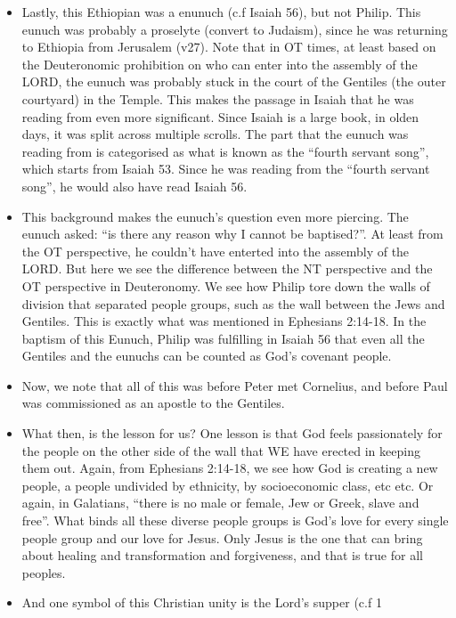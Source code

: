 \begin{itemize}
{  had his own chariot and he had hs own scroll of Isaiah.}
  \item{Lastly, this Ethiopian was a enunuch (c.f Isaiah 56), but not Philip.
  This eunuch was probably a proselyte (convert to Judaism), since he was
  returning to Ethiopia from Jerusalem (v27). Note that in OT times, at least
  based on the Deuteronomic prohibition on who can enter into the assembly of
  the LORD, the eunuch was probably stuck in the court of the Gentiles (the
  outer courtyard) in the Temple. This makes the passage in Isaiah that he
  was reading from even more significant. Since Isaiah is a large book, in
  olden days, it was split across multiple scrolls. The part that the eunuch
  was reading from is categorised as what is known as the ``fourth servant
  song'', which starts from Isaiah 53. Since he was reading from the ``fourth
  servant song'', he would also have read Isaiah 56. }
  \item{This background makes the eunuch's question even more piercing. The
  eunuch asked: ``is there any reason why I cannot be baptised?''. At least
  from the OT perspective, he couldn't have enterted into the assembly of the
  LORD. But here we see the difference between the NT perspective and the OT
  perspective in Deuteronomy. We see how Philip tore down the walls of
  division that separated people groups, such as the wall between the Jews
  and Gentiles. This is exactly what was mentioned in Ephesians 2:14-18. In
  the baptism of this Eunuch, Philip was fulfilling in Isaiah 56 that even
  all the Gentiles and the eunuchs can be counted as God's covenant people.}
  \item{Now, we note that all of this was before Peter met Cornelius, and
  before Paul was commissioned as an apostle to the Gentiles.}
  \item{What then, is the lesson for us? One lesson is that God feels
  passionately for the people on the other side of the wall that WE have
  erected in keeping them out. Again, from Ephesians 2:14-18, we see how God
  is creating a new people, a people undivided by ethnicity, by socioeconomic
  class, etc etc. Or again, in Galatians, ``there is no male or female, Jew
  or Greek, slave and free''. What binds all these diverse people groups is
  God's love for every single people group and our love for Jesus. Only Jesus
  is the one that can bring about healing and transformation and forgiveness,
  and that is true for all peoples.}
  \item{And one symbol of this Christian unity is the Lord's supper (c.f 1
}
\end{itemize}
